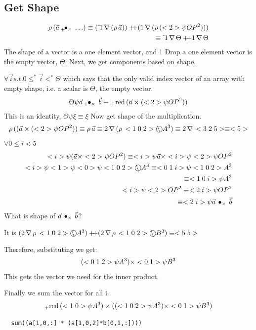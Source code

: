 \documentclass[a4paper,12pt]{article}
\begin{document}
\subsection{Get Shape}
\begin{eqnarray}
\shape (\vec a \innerprod+\times \ldots ) \equiv (\minus1 \drop (\shape \vec a) )\cat (1 \drop (\shape (\vc2 \psi {OP}^2))) \\ 
\equiv \minus1 \drop \Theta \cat 1 \drop \Theta
\end{eqnarray}
The shape of a vector is a one element vector, and 1 Drop a one element vector is the empty vector, $\Theta$.
Next, we get components based on shape.

$\forall \vec i s.t. 0  \leq^* \vec i <^* \Theta $ which says that the only valid index vector of an array with empty shape, i.e. a scalar is $\Theta$, the empty vector. 
\begin{eqnarray}
\Theta \psi \vec a \,{}_{+}\!\!\bullet_{\times}\, \vec b \equiv {}_{+}\!\operatorname{red}\, (\vec a \times (<2> \psi {OP}^2))
\end{eqnarray}
This is an identity, $\Theta \psi \xi \equiv \xi$ Now get shape of the multiplication.
\begin{eqnarray}
\rho\, ((\vec a \times (<2> \psi {OP}^2)) \equiv \rho\, \vec a \equiv  2 \,\nabla\, (\rho\, < 1\;0\;2> \bigcirc\!\!\!\!\!\backslash\; A^3 )\equiv 2 \,\nabla\, <3\;2\;5> \equiv <5>
\end{eqnarray}
$\forall 0 \leq i <5 $
\begin{eqnarray}
<i> \psi(\vec a \times <2>\psi {OP}^2) \equiv <i> \psi \vec a \times <i> \psi <2> \psi {OP}^2 \\
<i> \psi <1> \psi <0> \psi <1\;0\;2> \bigcirc\!\!\!\!\!\backslash\; A^3 \equiv <0\;1\;i> \psi <1\;0\;2> A^3\\
\equiv <1\;0\;i> \psi   A^3\\
<i> \psi  <2> {OP}^2 \equiv <2\;i> \psi {OP}^2\\
\equiv <2\;i> \psi {\vec a \,\bullet_{\times}\, \vec b}
\end{eqnarray}
What is shape of $\vec a \,\bullet_{\times}\, \vec b $? 

It is $(2\drop \shape \vccc102\transpose A^3) \cat (2\drop \shape \vccc102 \transpose B^3) \equiv \vcc55$

Therefore, substituting we get:
\[ (<0\;1\;2> \psi A^3) \times <0\;1> \psi B^3\]
This gets the vector we need for the inner product. 

Finally we sum the vector for all i.
\[ {}_{+}\!\operatorname{red}\, (<1\;0>\psi A^3) \times(( <1\;0\;2> \psi A^3)\times <0\;1> \psi B^3)\]
\begin{verbatim}
  sum((a[1,0,:] * (a[1,0,2]*b[0,1,:])))
\end{verbatim}



\end{document}
